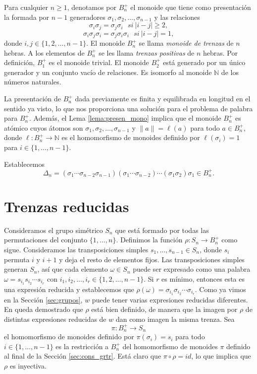 \documentclass[12pt]{book}
\theoremstyle{definition}
\providecommand{\norm}[1]{\lVert#1\rVert}
\begin{document}
Para cualquier $n\geq 1$, denotamos por $B_n^+$ el monoide que tiene como presentación la formada por $n-1$ generadores $\sigma_1,\sigma_2,\ldots,\sigma_{n-1}$ y las relaciones
$$\sigma_i\sigma_j=\sigma_j\sigma_i\ \ \ si\ |i-j|\geq 2,$$
$$\sigma_i\sigma_j\sigma_i=\sigma_j\sigma_i\sigma_i\ \ \ si\ |i-j|= 1,$$
donde $i,j\in\{1,2,\ldots,n-1\}$. El monoide $B_n^+$ se llama \textit{monoide de trenzas} de $n$ hebras. A los elementos de $B_n^+$ se les llama \textit{trenzas positivas} de $n$ hebras. Por definición, $B_1^+$ es el monoide trivial. El monoide $B_2^+$ está generado por un único generador y un conjunto vacío de relaciones. Es isomorfo al monoide $\mathbb{N}$ de los números naturales.

La presentación de $B_n^+$ dada previamente es finita y equilibrada en longitud en el sentido ya visto, lo que nos proporciona una solución para el problema de palabra para $B_n^+$. Además, el Lema \ref{lema:presen_mono} implica que el monoide $B_n^+$ es atómico cuyos átomos son $\sigma_1,\sigma_2,\ldots,\sigma_{n-1}$ y $\norm{a}=\ell(a)$ para todo $a\in B_n^+$, donde $\ell : B_n^+\rightarrow \mathbb{N}$ es el homomorfismo de monoides definido por $\ell(\sigma_i)=1$ para $i\in\{1,\ldots,n-1\}$.

Establecemos
$$\Delta_n = (\sigma_1\cdots\sigma_{n-2}\sigma_{n-1})(\sigma_1\cdots\sigma_{n-2})\cdots(\sigma_1\sigma_2)\sigma_1\in B_n^+.$$

\section{Trenzas reducidas}

Consideramos el grupo simétrico $S_n$ que está formado por todas las permutaciones del conjunto $\{1,\ldots,n\}$. Definimos la función $\rho:S_n\rightarrow B_n^+$ como sigue. Consideramos las transposiciones simples $s_1,\ldots,s_{n-1}\in S_n$, donde $s_i$ permuta $i$ y $i+1$ y deja el resto de elementos fijos. Las transposiciones simples generan $S_n$, así que cada elemento $\omega\in S_n$ puede ser expresado como una palabra $\omega = s_{i_1}s_{i_2}\cdots s_{i_r}$ con $i_1,i_2,\ldots,i_r\in\{1,2,\ldots,n-1\}$. Si $r$ es mínimo, entonces esta es una expresión reducida y establecemos que $\rho(\omega)=\sigma_{i_1}\sigma_{i_2}\cdots \sigma_{i_r}$. Como ya vimos en la Sección \ref{sec:grupos}, $w$ puede tener varias expresiones reducidas diferentes. En \cite{br_gr} queda demostrado que $\rho$ está bien definido, de manera que la imagen por $\rho$ de distintas expresiones reducidas de $w$ dan como imagen la misma trenza. Sea
$$\pi:B_n^+\rightarrow S_n$$
el homomorfismo de monoides definido por $\pi(\sigma_i)=s_i$ para todo $i\in\{1,\ldots,n-1\}$ es la restricción a $B_n^+$ del homomorfismo de monoides $\pi$ definido al final de la Sección \ref{sec:cons_grtr}. Está claro que $\pi\circ\rho = id$, lo que implica que $\rho$ es inyectiva.
\end{document}
